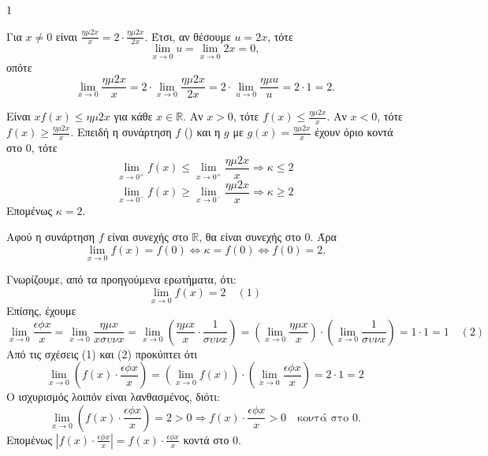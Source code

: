 \begin{ylh}{1}
    \item [Ύλη από εικόνα]
\end{ylh}
\begin{alist}
\item Για $x \neq 0$ είναι $\frac{\eta\mu 2x}{x} = 2 \cdot \frac{\eta\mu 2x}{2x}$.
Έτσι, αν θέσουμε $u = 2x$, τότε
\[ \lim_{x \to 0} u = \lim_{x \to 0} 2x = 0, \]
οπότε
\[ \lim_{x \to 0} \frac{\eta\mu 2x}{x} = 2 \cdot \lim_{x \to 0} \frac{\eta\mu 2x}{2x} = 2 \cdot \lim_{u \to 0} \frac{\eta\mu u}{u} = 2 \cdot 1 = 2. \]
\item Είναι $xf(x) \le \eta\mu 2x$ για κάθε $x \in \mathbb{R}$.
Αν $x > 0$, τότε $f(x) \le \frac{\eta\mu 2x}{x}$.
Αν $x < 0$, τότε $f(x) \ge \frac{\eta\mu 2x}{x}$.
Επειδή η συνάρτηση $f$ () και η $g$ με $g(x) = \frac{\eta\mu 2x}{x}$ έχουν όριο κοντά στο $0$, τότε
\[ \lim_{x \to 0^+} f(x) \le \lim_{x \to 0^+} \frac{\eta\mu 2x}{x} \Rightarrow \kappa \le 2 \]
\[ \lim_{x \to 0^-} f(x) \ge \lim_{x \to 0^-} \frac{\eta\mu 2x}{x} \Rightarrow \kappa \ge 2 \]
Επομένως $\kappa = 2$.
\item Αφού η συνάρτηση $f$ είναι συνεχής στο $\mathbb{R}$, θα είναι συνεχής στο $0$. Άρα
\[ \lim_{x \to 0} f(x) = f(0) \Leftrightarrow \kappa = f(0) \Leftrightarrow f(0) = 2. \]
\item Γνωρίζουμε, από τα προηγούμενα ερωτήματα, ότι:
\[ \lim_{x \to 0} f(x) = 2 \quad (1) \]
Επίσης, έχουμε
\[ \lim_{x \to 0} \frac{\epsilon\phi x}{x} = \lim_{x \to 0} \frac{\eta\mu x}{x \sigma\upsilon\nu x} = \lim_{x \to 0} \left( \frac{\eta\mu x}{x} \cdot \frac{1}{\sigma\upsilon\nu x} \right) = \left( \lim_{x \to 0} \frac{\eta\mu x}{x} \right) \cdot \left( \lim_{x \to 0} \frac{1}{\sigma\upsilon\nu x} \right) = 1 \cdot 1 = 1 \quad (2) \]
Από τις σχέσεις (1) και (2) προκύπτει ότι
\[ \lim_{x \to 0} \left( f(x) \cdot \frac{\epsilon\phi x}{x} \right) = \left( \lim_{x \to 0} f(x) \right) \cdot \left( \lim_{x \to 0} \frac{\epsilon\phi x}{x} \right) = 2 \cdot 1 = 2 \]
Ο ισχυρισμός λοιπόν είναι λανθασμένος, διότι:
\[ \lim_{x \to 0} \left( f(x) \cdot \frac{\epsilon\phi x}{x} \right) = 2 > 0 \Rightarrow f(x) \cdot \frac{\epsilon\phi x}{x} > 0 \quad \text{κοντά στο } 0. \]
Επομένως $\left| f(x) \cdot \frac{\epsilon\phi x}{x} \right| = f(x) \cdot \frac{\epsilon\phi x}{x}$ κοντά στο $0$.
\end{alist}